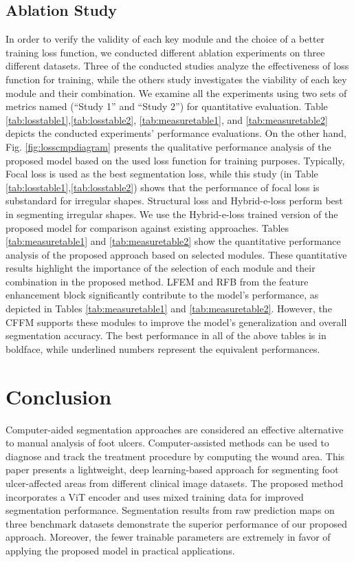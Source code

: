 \documentclass[review]{elsarticle}
\begin{document}
\subsection{Ablation Study}
In order to verify the validity of each key module and the choice of a better training loss function, we conducted different ablation experiments on three different datasets. Three of the conducted studies analyze the effectiveness of loss function for training, while the others study investigates the viability of each key module and their combination. We examine all the experiments using two sets of metrics named (\enquote{Study 1} and \enquote{Study 2}) for quantitative evaluation. Table \ref{tab:losstable1},\ref{tab:losstable2}, \ref{tab:measuretable1}, and \ref{tab:measuretable2} depicts the conducted experiments’ performance evaluations. On the other hand, Fig. \ref{fig:losscmpdiagram} presents the qualitative performance analysis of the proposed model based on the used loss function for training purposes.
\newline\indent Typically, Focal loss is used as the best segmentation loss, while this study (in Table \ref{tab:losstable1},\ref{tab:losstable2}) shows that the performance of focal loss is substandard for irregular shapes. Structural loss and Hybrid-e-loss perform best in segmenting irregular shapes. We use the Hybrid-e-loss trained version of the proposed model for comparison against existing approaches. Tables \ref{tab:measuretable1} and \ref{tab:measuretable2} show the quantitative performance analysis of the proposed approach based on selected modules. These quantitative results highlight the importance of the selection of each module and their combination in the proposed method. LFEM and RFB from the feature enhancement block significantly contribute to the model’s performance, as depicted in Tables \ref{tab:measuretable1} and \ref{tab:measuretable2}. However, the CFFM supports these modules to improve the model’s generalization and overall segmentation accuracy. The best performance in all of the above tables is in boldface, while underlined numbers represent the equivalent performances. 

\section{Conclusion}
Computer-aided segmentation approaches are considered an effective alternative to manual analysis of foot ulcers. Computer-assisted methods can be used to diagnose and track the treatment procedure by computing the wound area. This paper presents a lightweight, deep learning-based approach for segmenting foot ulcer-affected areas from different clinical image datasets. The proposed method incorporates a ViT encoder and uses mixed training data for improved segmentation performance. Segmentation results from raw prediction maps on three benchmark datasets demonstrate the superior performance of our proposed approach. Moreover, the fewer trainable parameters are extremely in favor of applying the proposed model in practical applications.


	

\end{document}
